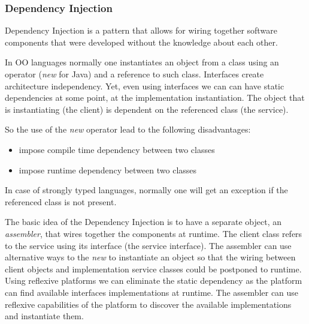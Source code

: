 \subsubsection{Dependency Injection}

Dependency Injection is a pattern that allows for wiring together software components that were developed without the knowledge about each other.~\cite{fowler_inversion_2004}

In OO languages normally one instantiates an object from a class using an operator (\emph{new} for Java) and a reference to such class.
Interfaces create architecture independency. Yet, even using interfaces we can can have static dependencies at some point, at the implementation instantiation.
The object that is instantiating (the client) is dependent on the referenced class (the service).

So the use of the \emph{new} operator lead to the following disadvantages:
\begin{itemize}
  \item impose compile time dependency between two classes
  \item impose runtime dependency between two classes
\end{itemize}

In case of strongly typed languages, normally one will get an exception if the referenced class is not present.

The basic idea of the Dependency Injection is to have a separate object, an \emph{assembler}, that wires together the components at runtime\cite{fowler_inversion_2004}. The client class refers to the service using its interface (the service interface). The assembler can use alternative ways to the \emph{new} to instantiate an object so that the wiring between client objects and implementation service classes could be postponed to runtime. Using reflexive platforms we can eliminate the static dependency as the platform can find available interfaces implementations at runtime.
The assembler can use reflexive capabilities of the platform to discover the available implementations and instantiate them.

